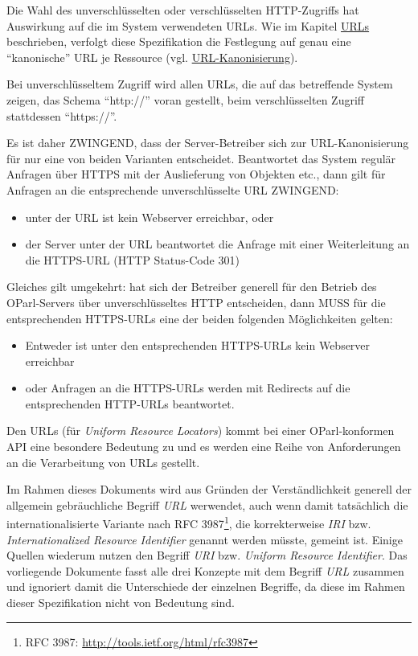 \documentclass[,a4paper]{article}
\begin{document}
Die Wahl des unverschlüsselten oder verschlüsselten HTTP-Zugriffs hat
Auswirkung auf die im System verwendeten URLs. Wie im Kapitel
\hyperref[urls]{URLs} beschrieben, verfolgt diese Spezifikation die
Festlegung auf genau eine ``kanonische'' URL je Ressource (vgl.
\hyperref[urlux5fkanonisierung]{URL-Kanonisierung}).

Bei unverschlüsseltem Zugriff wird allen URLs, die auf das betreffende
System zeigen, das Schema ``http://'' voran gestellt, beim
verschlüsselten Zugriff stattdessen ``https://''.

Es ist daher ZWINGEND, dass der Server-Betreiber sich zur
URL-Kanonisierung für nur eine von beiden Varianten entscheidet.
Beantwortet das System regulär Anfragen über HTTPS mit der Auslieferung
von Objekten etc., dann gilt für Anfragen an die entsprechende
unverschlüsselte URL ZWINGEND:

\begin{itemize}
\item
  unter der URL ist kein Webserver erreichbar, oder
\item
  der Server unter der URL beantwortet die Anfrage mit einer
  Weiterleitung an die HTTPS-URL (HTTP Status-Code 301)
\end{itemize}

Gleiches gilt umgekehrt: hat sich der Betreiber generell für den Betrieb
des OParl-Servers über unverschlüsseltes HTTP entscheiden, dann MUSS für
die entsprechenden HTTPS-URLs eine der beiden folgenden Möglichkeiten
gelten:

\begin{itemize}
\item
  Entweder ist unter den entsprechenden HTTPS-URLs kein Webserver
  erreichbar
\item
  oder Anfragen an die HTTPS-URLs werden mit Redirects auf die
  entsprechenden HTTP-URLs beantwortet.
\end{itemize}


Den URLs (für \emph{Uniform Resource Locators}) kommt bei einer
OParl-konformen API eine besondere Bedeutung zu und es werden eine Reihe
von Anforderungen an die Verarbeitung von URLs gestellt.

Im Rahmen dieses Dokuments wird aus Gründen der Verständlichkeit
generell der allgemein gebräuchliche Begriff \emph{URL} werwendet, auch
wenn damit tatsächlich die internationalisierte Variante nach RFC
3987\footnote{RFC 3987: \url{http://tools.ietf.org/html/rfc3987}}, die
korrekterweise \emph{IRI} bzw. \emph{Internationalized Resource
Identifier} genannt werden müsste, gemeint ist. Einige Quellen wiederum
nutzen den Begriff \emph{URI} bzw. \emph{Uniform Resource Identifier}.
Das vorliegende Dokumente fasst alle drei Konzepte mit dem Begriff
\emph{URL} zusammen und ignoriert damit die Unterschiede der einzelnen
Begriffe, da diese im Rahmen dieser Spezifikation nicht von Bedeutung
sind.
\end{document}
